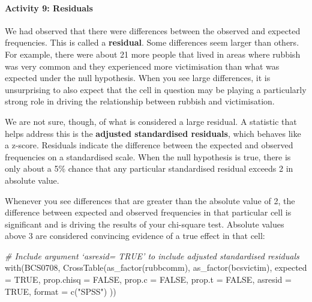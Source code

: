 \documentclass[
]{book}
\newenvironment{Shaded}{\begin{snugshade}}{\end{snugshade}}
\newcommand{\AttributeTok}[1]{\textcolor[rgb]{0.77,0.63,0.00}{#1}}
\newcommand{\CommentTok}[1]{\textcolor[rgb]{0.56,0.35,0.01}{\textit{#1}}}
\newcommand{\ConstantTok}[1]{\textcolor[rgb]{0.00,0.00,0.00}{#1}}
\newcommand{\FunctionTok}[1]{\textcolor[rgb]{0.00,0.00,0.00}{#1}}
\newcommand{\NormalTok}[1]{#1}
\newcommand{\StringTok}[1]{\textcolor[rgb]{0.31,0.60,0.02}{#1}}
\begin{document}
\hypertarget{activity-9-residuals}{%
\paragraph{Activity 9: Residuals}\label{activity-9-residuals}}

We had observed that there were differences between the observed and expected frequencies. This is called a \textbf{residual}. Some differences seem larger than others. For example, there were about 21 more people that lived in areas where rubbish was very common and they experienced more victimisation than what was expected under the null hypothesis. When you see large differences, it is unsurprising to also expect that the cell in question may be playing a particularly strong role in driving the relationship between rubbish and victimisation.

We are not sure, though, of what is considered a large residual. A statistic that helps address this is the \textbf{adjusted standardised residuals}, which behaves like a z-score. Residuals indicate the difference between the expected and observed frequencies on a standardised scale. When the null hypothesis is true, there is only about a 5\% chance that any particular standardised residual exceeds 2 in absolute value.

Whenever you see differences that are greater than the absolute value of 2, the difference between expected and observed frequencies in that particular cell is significant and is driving the results of your chi-square test. Absolute values above 3 are considered convincing evidence of a true effect in that cell:

\begin{Shaded}
\begin{Highlighting}[]
\CommentTok{\# Include argument ‘asresid= TRUE’ to include adjusted standardised residuals}
\FunctionTok{with}\NormalTok{(BCS0708, }\FunctionTok{CrossTable}\NormalTok{(}\FunctionTok{as\_factor}\NormalTok{(rubbcomm), }\FunctionTok{as\_factor}\NormalTok{(bcsvictim), }\AttributeTok{expected =} \ConstantTok{TRUE}\NormalTok{,}
                         \AttributeTok{prop.chisq =} \ConstantTok{FALSE}\NormalTok{, }\AttributeTok{prop.c =} \ConstantTok{FALSE}\NormalTok{, }\AttributeTok{prop.t =} \ConstantTok{FALSE}\NormalTok{, }\AttributeTok{asresid =}
                           \ConstantTok{TRUE}\NormalTok{, }\AttributeTok{format =} \FunctionTok{c}\NormalTok{(}\StringTok{"SPSS"}\NormalTok{) ))}
\end{Highlighting}
\end{Shaded}
\end{document}

